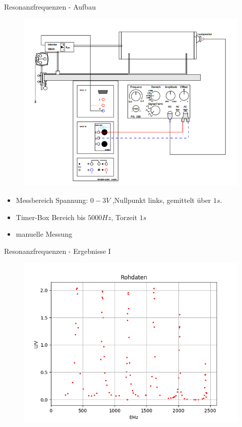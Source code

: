 \documentclass[12pt]{beamer}
\begin{document}
	\begin{frame}{Resonanzfrequenzen - Aufbau}
	\begin{figure}
	\begin{flushleft}
	\includegraphics[scale=0.35]{aufbau}
	\end{flushleft}
	\end{figure}
	
	\begin{flushright}
	\begin{itemize}
	\item  Messbereich Spannung: $0-3V$ ,Nullpunkt links, gemittelt über $1s$.
	\item Timer-Box Bereich bis $5000Hz$, Torzeit $1s$
	\item manuelle Messung
	\end{itemize}
	\end{flushright}
	\end{frame}
	
	\begin{frame}{Resonanzfrequenzen - Ergebnisse I}
	\begin{figure}
	\includegraphics[scale=0.5]{rohres}
	\end{figure}
	\end{frame}
	
\end{document}
